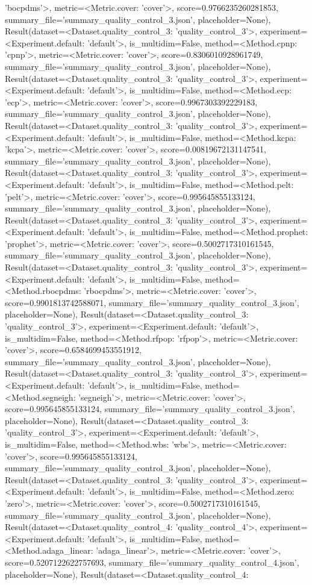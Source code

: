 'bocpdms'>, metric=<Metric.cover: 'cover'>, score=0.9766235260281853, summary_file='summary_quality_control_3.json', placeholder=None), Result(dataset=<Dataset.quality_control_3: 'quality_control_3'>, experiment=<Experiment.default: 'default'>, is_multidim=False, method=<Method.cpnp: 'cpnp'>, metric=<Metric.cover: 'cover'>, score=0.8306010928961749, summary_file='summary_quality_control_3.json', placeholder=None), Result(dataset=<Dataset.quality_control_3: 'quality_control_3'>, experiment=<Experiment.default: 'default'>, is_multidim=False, method=<Method.ecp: 'ecp'>, metric=<Metric.cover: 'cover'>, score=0.9967303392229183, summary_file='summary_quality_control_3.json', placeholder=None), Result(dataset=<Dataset.quality_control_3: 'quality_control_3'>, experiment=<Experiment.default: 'default'>, is_multidim=False, method=<Method.kcpa: 'kcpa'>, metric=<Metric.cover: 'cover'>, score=0.00819672131147541, summary_file='summary_quality_control_3.json', placeholder=None), Result(dataset=<Dataset.quality_control_3: 'quality_control_3'>, experiment=<Experiment.default: 'default'>, is_multidim=False, method=<Method.pelt: 'pelt'>, metric=<Metric.cover: 'cover'>, score=0.995645855133124, summary_file='summary_quality_control_3.json', placeholder=None), Result(dataset=<Dataset.quality_control_3: 'quality_control_3'>, experiment=<Experiment.default: 'default'>, is_multidim=False, method=<Method.prophet: 'prophet'>, metric=<Metric.cover: 'cover'>, score=0.5002717310161545, summary_file='summary_quality_control_3.json', placeholder=None), Result(dataset=<Dataset.quality_control_3: 'quality_control_3'>, experiment=<Experiment.default: 'default'>, is_multidim=False, method=<Method.rbocpdms: 'rbocpdms'>, metric=<Metric.cover: 'cover'>, score=0.9901813742588071, summary_file='summary_quality_control_3.json', placeholder=None), Result(dataset=<Dataset.quality_control_3: 'quality_control_3'>, experiment=<Experiment.default: 'default'>, is_multidim=False, method=<Method.rfpop: 'rfpop'>, metric=<Metric.cover: 'cover'>, score=0.6584699453551912, summary_file='summary_quality_control_3.json', placeholder=None), Result(dataset=<Dataset.quality_control_3: 'quality_control_3'>, experiment=<Experiment.default: 'default'>, is_multidim=False, method=<Method.segneigh: 'segneigh'>, metric=<Metric.cover: 'cover'>, score=0.995645855133124, summary_file='summary_quality_control_3.json', placeholder=None), Result(dataset=<Dataset.quality_control_3: 'quality_control_3'>, experiment=<Experiment.default: 'default'>, is_multidim=False, method=<Method.wbs: 'wbs'>, metric=<Metric.cover: 'cover'>, score=0.995645855133124, summary_file='summary_quality_control_3.json', placeholder=None), Result(dataset=<Dataset.quality_control_3: 'quality_control_3'>, experiment=<Experiment.default: 'default'>, is_multidim=False, method=<Method.zero: 'zero'>, metric=<Metric.cover: 'cover'>, score=0.5002717310161545, summary_file='summary_quality_control_3.json', placeholder=None), Result(dataset=<Dataset.quality_control_4: 'quality_control_4'>, experiment=<Experiment.default: 'default'>, is_multidim=False, method=<Method.adaga_linear: 'adaga_linear'>, metric=<Metric.cover: 'cover'>, score=0.5207122622757693, summary_file='summary_quality_control_4.json', placeholder=None), Result(dataset=<Dataset.quality_control_4: 